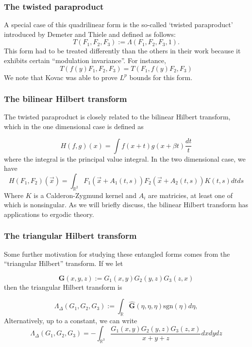 \documentclass[usenames,dvipsnames,12pt]{beamer}
\newcommand{\R}{\mathbb{R}}
\begin{document}
\begin{frame}\frametitle{The twisted paraproduct}

A special case of this quadrilinear form is the so-called `twisted paraproduct' introduced by Demeter and Thiele and defined as follows:
%
\begin{equation*}\label{jdjfparaproduct}
T(F_1, F_2, F_3):= \Lambda(F_1, F_2, F_3, 1).
\end{equation*}
\pause
This form had to be treated differently than the others in their work because it exhibits certain ``modulation invariance''. \pause For instance,
\begin{equation*}
T(f(y) F_1, F_2, F_3) = T(F_1, f(y) F_2 , F_3)
\end{equation*}
We note that Kovac was able to prove $L^p$ bounds for this form.
\end{frame}

\begin{frame}
\frametitle{The bilinear Hilbert transform}
The twisted paraproduct is closely related to the bilinear Hilbert transform, which in the one dimensional case is defined as

\begin{equation*}
H(f, g)(x)= \int f(x+t) g(x+\beta t)\dfrac{dt}{t}
\end{equation*}
where the integral is the principal value integral. \pause In the two dimensional case, we have
\begin{equation*}
H(F_1, F_2)(\vec{x})=\int_{\mathbb{R}^2}F_1(\vec{x}+A_1(t, s)) F_2(\vec{x} + A_2(t, s)) K(t, s) dt ds
\end{equation*}
Where $K$ is a Calderon-Zygmund kernel and $A_i$ are matricies, at least one of which is nonsingular. As we will briefly discuss, the bilinear Hilbert transform has applications to ergodic theory.
\end{frame}
\begin{frame}
\frametitle{The triangular Hilbert transform}
Some further motivation for studying these entangled forms comes from the ``triangular Hilbert'' transform. If we let

\begin{equation*}
\mathbf{G}(x, y, z):=G_1(x, y) G_2(y, z) G_3(z, x)
\end{equation*}
\pause
then the triangular Hilbert transform is

\begin{equation*}
\Lambda_\Delta(G_1, G_2, G_3) := \int_{\R} \widehat{\mathbf{G}}(\eta, \eta, \eta) \text{sgn}(\eta) d\eta,
\end{equation*}
%
\pause
Alternatively, up to a constant, we can write
\begin{equation*}
\Lambda_\Delta(G_1, G_2, G_3) = - \int_{\R^3} \frac{G_1(x, y) G_2(y, z) G_3(z, x)}{x + y + z} dx dy dz
\end{equation*}
\end{frame}
\end{document}
